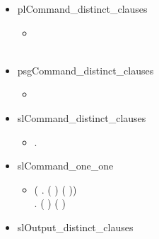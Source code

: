 \begin{itemize}
    \item plCommand_distinct_clauses
  \begin{itemize}
    \item[] \HOLTokenTurnstile{}  \HOLSymConst{\HOLTokenNotEqual{}}  \HOLSymConst{\HOLTokenConj{}}  \HOLSymConst{\HOLTokenNotEqual{}}  \HOLSymConst{\HOLTokenConj{}} \\ \HOLSymConst{\HOLTokenNotEqual{}}  \HOLSymConst{\HOLTokenConj{}}
    \HOLSymConst{\HOLTokenNotEqual{}}  \HOLSymConst{\HOLTokenConj{}} \\ \HOLSymConst{\HOLTokenNotEqual{}}  \HOLSymConst{\HOLTokenConj{}}
    \HOLSymConst{\HOLTokenNotEqual{}} 
 \end{itemize}
 \item psgCommand_distinct_clauses
  \begin{itemize}
    \item[] \HOLTokenTurnstile{}  \HOLSymConst{\HOLTokenNotEqual{}} 
    \end{itemize}
    \item slCommand_distinct_clauses
  \begin{itemize}
    \item[] \HOLTokenTurnstile{} \HOLSymConst{\HOLTokenForall{}} .   \HOLSymConst{\HOLTokenNotEqual{}}  
    \end{itemize}
    \item slCommand_one_one
  \begin{itemize}
    \item[] \HOLTokenTurnstile{} (\HOLSymConst{\HOLTokenForall{}} . (  \HOLSymConst{=}  ) \HOLSymConst{\HOLTokenEquiv{}} ( \HOLSymConst{=} )) \HOLSymConst{\HOLTokenConj{}}
   \\\HOLSymConst{\HOLTokenForall{}} . (  \HOLSymConst{=}  ) \HOLSymConst{\HOLTokenEquiv{}} ( \HOLSymConst{=} )
 \end{itemize}
 \item slOutput_distinct_clauses

\end{itemize}
